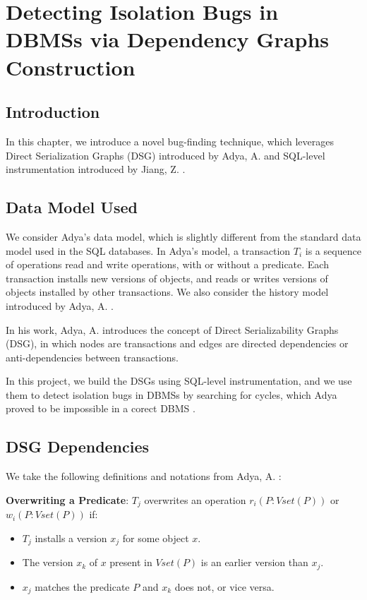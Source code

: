 \chapter{Detecting Isolation Bugs in DBMSs via Dependency Graphs Construction}

\section{Introduction}

In this chapter, we introduce a novel bug-finding technique, which leverages Direct Serialization Graphs (DSG) introduced by Adya, A. \cite{adya1999weak} and SQL-level instrumentation introduced by Jiang, Z. \cite{jiang2023detecting}.

\section{Data Model Used}

We consider Adya's data model, which is slightly different from the standard data model used in the SQL databases. In Adya's model, a transaction $T_i$ is a sequence of operations read and write operations, with or without a predicate. Each transaction installs new versions of objects, and reads or writes versions of objects installed by other transactions. We also consider the history model introduced by Adya, A. \cite{adya1999weak}.

In his work, Adya, A. \cite{adya1999weak} introduces the concept of Direct Serializability Graphs (DSG), in which nodes are transactions and edges are directed dependencies or anti-dependencies between transactions.

In this project, we build the DSGs using SQL-level instrumentation, and we use them to detect isolation bugs in DBMSs by searching for cycles, which Adya proved to be impossible in a corect DBMS \cite{adya1999weak}.

\section{DSG Dependencies}

We take the following definitions and notations from Adya, A. \cite{adya1999weak}:


\begin{definition}
    \textbf{Overwriting a Predicate}: $T_j$ overwrites an operation $r_i(P: Vset(P))$ or $w_i(P: Vset(P))$ if:
    \begin{itemize}
        \item $T_j$ installs a version $x_j$ for some object $x$.
        \item The version $x_k$ of $x$ present in $Vset(P)$ is an earlier version than $x_j$.
        \item $x_j$ matches the predicate $P$ and $x_k$ does not, or vice versa.
    \end{itemize}  
\end{definition}

